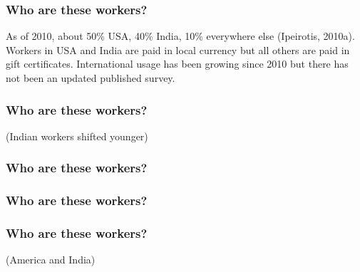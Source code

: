 \documentclass[slides]{beamer} %
\begin{document}
\begin{frame}\frametitle{Who are these workers?}

As of 2010, about 50\% USA, 40\% India, 10\% everywhere else (Ipeirotis, 2010a).  \pause Workers in USA and India are paid in local currency but all others are paid in gift certificates.  \pause International usage has been growing since 2010 but there has not been an updated published survey. \pause




\end{frame}

\begin{frame}\frametitle{Who are these workers?}


\centering
(Indian workers shifted younger)

\end{frame}

\begin{frame}\frametitle{Who are these workers?}


\end{frame}

\begin{frame}\frametitle{Who are these workers?}


\end{frame}

\begin{frame}\frametitle{Who are these workers?}

\centering
(America and India)

\end{frame}
\end{document}
